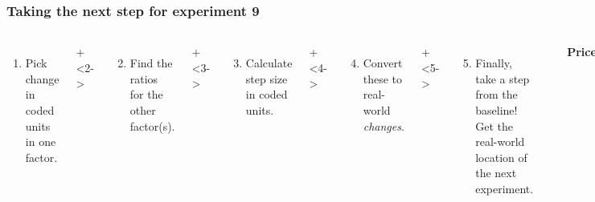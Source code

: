 \begin{frame}\frametitle{Taking the next step for experiment 9}
	\begin{columns}[T]
		
			\vspace{0.1cm}
			{\tiny 
				\begin{enumerate}
					\item	Pick change in coded units in one factor.
				\end{enumerate}
			 \par}
			\onslide+<2->{
				{\tiny 
					\begin{enumerate}\setcounter{enumi}{1}
						\item	Find the ratios for the other factor(s).
					\end{enumerate}
				
				\par}
			}
			
			\vspace{0.9cm}
			\onslide+<3->{
				{\tiny 
					\begin{enumerate}\setcounter{enumi}{2}
						\item	Calculate step size in coded units.
					\end{enumerate}
				
				\par}
			}
			
			\vspace{0.4cm}
			\onslide+<4->{
				{\tiny 
					\begin{enumerate}\setcounter{enumi}{3}
						\item	Convert these to real-world \emph{changes}.
					\end{enumerate}
				
				\par}
			}
			
			\vspace{1cm}
			\onslide+<5->{
				{\tiny 
					\begin{enumerate}\setcounter{enumi}{4}
						\item	Finally, take a step from the baseline! Get the real-world location
						of the next experiment.
					\end{enumerate}
				
				\par}
			}
				
			\rule[3mm]{0.01cm}{85mm}%
			
			
			\centerline{\textbf{Price}}
			

\end{columns}
\end{frame}
